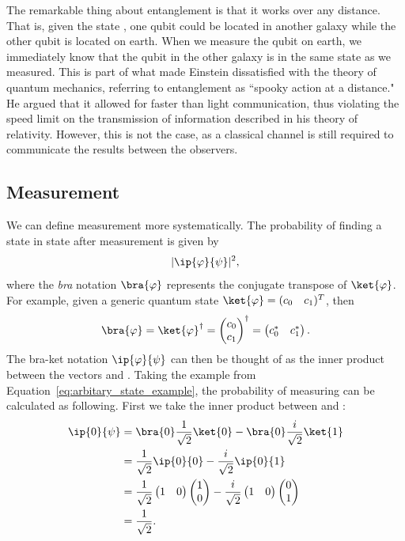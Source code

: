 \documentclass[a4paper,10pt]{article}
\newcommand{\qstatezero}{
	\begin{pmatrix}1 \\ 0\end{pmatrix}
}
\newcommand{\qstateone}{
	\begin{pmatrix}0 \\ 1\end{pmatrix}
}
\begin{document}
The remarkable thing about entanglement is that it works over any distance.
That is, given the state \ket{\Phi^+}, one qubit could be located in another galaxy while the other qubit is located on earth.
When we measure the qubit on earth, we immediately know that the qubit in the other galaxy is in the same state as we measured.
This is part of what made Einstein dissatisfied with the theory of quantum mechanics, referring to entanglement as ``spooky action at a distance."
He argued that it allowed for faster than light communication, thus violating the speed limit on the transmission of information described in his theory of relativity.
However, this is not the  case, as a classical channel is still required to communicate the results between the observers.

\subsection{Measurement}
We can define measurement more systematically.
The probability of finding a state \ket{\psi} in state \ket{\varphi} after measurement is given by
\begin{equation}
\lvert\ip{\varphi}{\psi}\rvert^2,
\end{equation}
where the \emph{bra} notation $\bra{\varphi}$ represents the conjugate transpose of $\ket{\varphi}$.
For example, given a generic quantum state $\ket{\varphi} = (\begin{matrix}c_0 & c_1\end{matrix})^T$, then 
\begin{equation}
\bra{\varphi} = \ket{\varphi}^\dagger = \begin{pmatrix}c_0 \\ c_1\end{pmatrix}^\dagger =  \begin{pmatrix}c_0^* & c_1^*\end{pmatrix}.
\end{equation}
The bra-ket notation $\ip{\varphi}{\psi}$ can then be thought of as the inner product between the vectors \ket{\varphi} and \ket{\psi}.
Taking the example from Equation~\ref{eq:arbitary_state_example}, the probability of measuring  can be calculated as following.
First we take the inner product between  and \ket{\psi}:
\begin{equation}
\begin{aligned}
\ip{0}{\psi} &= \bra{0}\dfrac{1}{\sqrt2}\ket{0} - \bra{0}\dfrac{i}{\sqrt2}\ket{1} \\
&= \dfrac{1}{\sqrt2}\ip{0}{0} - \dfrac{i}{\sqrt2}\ip{0}{1} \\
&= \dfrac{1}{\sqrt2}\begin{pmatrix}1 & 0\end{pmatrix} \qstatezero - \dfrac{i}{\sqrt2}\begin{pmatrix}1 & 0\end{pmatrix} \qstateone \\
&= \dfrac{1}{\sqrt2}. \\
\end{aligned}
\end{equation}
\end{document}

